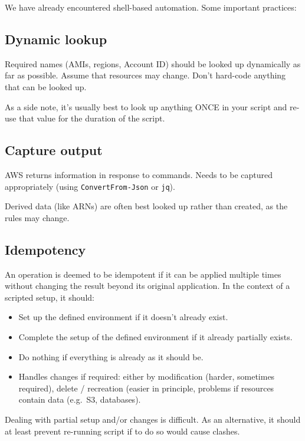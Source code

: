 \documentclass[slides]{pgnotes}
\begin{document}
We have already encountered shell-based automation. Some important practices:

\subsection{Dynamic lookup}\label{dynamic-lookup}

Required names (AMIs, regions, Account ID) should be looked up
dynamically as far as possible. Assume that resources may change. Don't
hard-code anything that can be looked up.

As a side note, it's usually best to look up anything ONCE in your script and re-use that value for the duration of the script.

\subsection{Capture output}\label{capture-output}

AWS returns information in response to commands. Needs to be captured appropriately (using \texttt{ConvertFrom-Json} or \texttt{jq}).

Derived data (like ARNs) are often best looked up rather than created, as the rules may change.

\subsection{Idempotency}\label{idempotency}

An operation is deemed to be idempotent if it can be applied multiple times without changing the result beyond its original application.
In the context of a scripted setup, it should:

\begin{itemize}
\item
  Set up the defined environment if it doesn't already exist.
\item
  Complete the setup of the defined environment if it already partially  exists.
\item
  Do nothing if everything is already as it should be.
\item
  Handles changes if required: either by modification (harder, sometimes
  required), delete / recreation (easier in principle, problems if
  resources contain data (e.g.~S3, databases).
\end{itemize}

Dealing with partial setup and/or changes is difficult. As an
alternative, it should at least prevent re-running script if to do so
would cause clashes.
\end{document}
